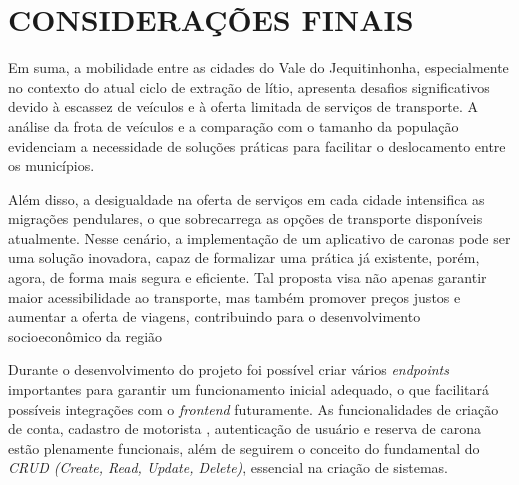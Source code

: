 \chapter{CONSIDERAÇÕES FINAIS}

Em suma, a mobilidade entre as cidades do Vale do Jequitinhonha, especialmente no contexto do atual ciclo de extração de lítio, apresenta desafios significativos devido à escassez de veículos e à oferta limitada de serviços de transporte. A análise da frota de veículos e a comparação com o tamanho da população evidenciam a necessidade de soluções práticas para facilitar o deslocamento entre os municípios.

Além disso, a desigualdade na oferta de serviços em cada cidade intensifica as migrações pendulares, o que sobrecarrega as opções de transporte disponíveis atualmente. Nesse cenário, a implementação de um aplicativo de caronas pode ser uma solução inovadora, capaz de formalizar uma prática já existente, porém, agora, de forma mais segura e eficiente. Tal proposta visa não apenas garantir maior acessibilidade ao transporte, mas também promover preços justos e aumentar a oferta de viagens, contribuindo para o desenvolvimento socioeconômico da região

Durante o desenvolvimento do projeto foi possível criar vários \textit{endpoints} importantes para garantir um funcionamento inicial adequado, o que facilitará possíveis integrações com o \textit{frontend} futuramente. As funcionalidades de criação de conta, cadastro de motorista , autenticação de usuário e reserva de carona estão plenamente funcionais, além de seguirem o conceito do fundamental do \textit{CRUD (Create, Read, Update, Delete)}, essencial na criação de sistemas. 





